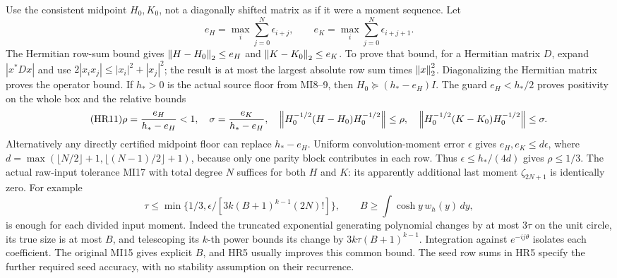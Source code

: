 Use the consistent midpoint \(H_0,K_0\), not a diagonally shifted
matrix as if it were a moment sequence. Let
\begin{equation}\tag{HR10}\label{hrv:HR10}
e_H=\max_i\sum_{j=0}^N\epsilon_{i+j},\qquad
e_K=\max_i\sum_{j=0}^N\epsilon_{i+j+1}.
\end{equation}
The Hermitian row-sum bound gives \(\left\lVert H-H_0\right\rVert_2\le e_H\) and
\(\left\lVert K-K_0\right\rVert_2\le e_K\). To prove that bound, for a Hermitian
matrix \(D\), expand \(|x^*Dx|\) and use
\(2|x_i x_j|\le|x_i|^2+|x_j|^2\); the result is at most the
largest absolute row sum times \(\left\lVert x\right\rVert_2^2\). Diagonalizing the
Hermitian matrix proves the operator bound.
If \(h_*>0\) is the actual source floor from MI8--9, then
\(H_0\succeq(h_*-e_H)I\). The guard \(e_H<h_*/2\) proves positivity
on the whole box and the relative bounds
\begin{equation}\tag{HR11}\label{hrv:HR11}
\rho=\frac{e_H}{h_*-e_H}<1,\quad
\sigma=\frac{e_K}{h_*-e_H},\quad
\left\lVert H_0^{-1/2}(H-H_0)H_0^{-1/2}\right\rVert\le\rho,\quad
\left\lVert H_0^{-1/2}(K-K_0)H_0^{-1/2}\right\rVert\le\sigma.
\end{equation}
Alternatively any directly certified midpoint floor can replace
\(h_*-e_H\). Uniform convolution-moment error \(\epsilon\) gives
\(e_H,e_K\le d\epsilon\), where
\(d=\max(\lfloor N/2\rfloor+1,\lfloor(N-1)/2\rfloor+1)\), because
only one parity block contributes in each row. Thus
\(\epsilon\le h_*/(4d)\) gives \(\rho\le1/3\).
The actual raw-input tolerance MI17 with total degree \(N\) suffices
for both \(H\) and \(K\): its apparently additional last moment
\(\zeta_{2N+1}\) is identically zero. For example
\begin{equation}\tag{HR12}\label{hrv:HR12}
\tau\le\min\{1/3,\epsilon/[3k(B+1)^{k-1}(2N)!]\},\qquad
B\ge\int\cosh y\,w_h(y)\,dy,
\end{equation}
is enough for each divided input moment. Indeed the truncated
exponential generating polynomial changes by at most \(3\tau\) on
the unit circle, its true size is at most \(B\), and telescoping
its \(k\)-th power bounds its change by \(3k\tau(B+1)^{k-1}\).
Integration against \(e^{-ij\theta}\) isolates each coefficient.
The original MI15 gives explicit \(B\), and HR5 usually improves this
common bound. The seed row sums in HR5 specify the further required
seed accuracy, with no stability assumption on their recurrence.


